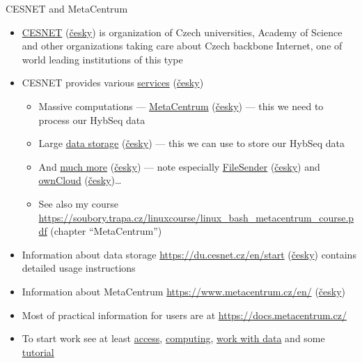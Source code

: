 \documentclass[compress,  xelatex, 11pt, xcolor=x11names, aspectratio=169,
	hyperref={
		bookmarks=true,
		unicode=true,
		colorlinks=true,
		pdftitle={HybSeq course},
		plainpages=false,
		pdfauthor={Vojtech Zeisek},
		pdfsubject={Practical processing of HybSeq target enrichment sequencing data on computing grids like MetaCentrum},
		pdfcreator={XeLaTeX},
		pdfkeywords={BASH, command line, GNU, HybSeq, Linux, MetaCentrum, sequencing shell, target enrichment},
		linkcolor=Turquoise4, %
		anchorcolor=DodgerBlue4, %
		citecolor=DodgerBlue4, %
		filecolor=DodgerBlue4, %
		menucolor=Tan4, %
		urlcolor=DarkOliveGreen4 %
		},
	url={hyphens, lowtilde} %
	]{beamer}
\renewcommand{\alert}[1]{\textcolor{OrangeRed3}{#1}}
\begin{document}
\begin{frame}[allowframebreaks]{CESNET and MetaCentrum}
	\label{CESNET}
	\begin{itemize}
		\item \href{https://www.cesnet.cz/en/}{CESNET} (\href{https://www.cesnet.cz/}{česky}) is organization of Czech universities, Academy of Science and other organizations taking care about Czech backbone Internet, one of world leading institutions of this type
		\item CESNET provides various \href{https://www.cesnet.cz/en/services}{services} (\href{https://www.cesnet.cz/sluzby/}{česky})
		\begin{itemize}
			\item Massive computations --- \href{https://www.cesnet.cz/en/services/computing-2/metacentrum-10}{MetaCentrum} (\href{https://www.cesnet.cz/sluzby/vypocty-2/narocne-vypocty-metacentrum-10}{česky}) --- \alert{this we need to process our HybSeq data}
			\item Large \href{https://www.cesnet.cz/en/services/data-storage-3/data-storage-13}{data storage} (\href{https://www.cesnet.cz/sluzby/datova-uloziste-3/datova-uloziste-13}{česky}) --- \alert{this we can use to store our HybSeq data}
			\item And \href{https://www.cesnet.cz/en/services}{much more} (\href{https://www.cesnet.cz/sluzby/}{česky}) --- note especially \href{https://www.cesnet.cz/en/services/data-storage-3/filesender-15}{FileSender} (\href{https://www.cesnet.cz/sluzby/datova-uloziste-3/filesender-15}{česky}) and \href{https://www.cesnet.cz/en/services/data-storage-3/owncloud-16}{ownCloud} (\href{https://www.cesnet.cz/sluzby/datova-uloziste-3/owncloud-16}{česky})\ldots
			\item See also my course \url{https://soubory.trapa.cz/linuxcourse/linux_bash_metacentrum_course.pdf} (chapter \enquote{MetaCentrum})
		\end{itemize}
		\item Information about data storage \url{https://du.cesnet.cz/en/start} (\href{https://du.cesnet.cz/cs/start}{česky}) contains detailed usage instructions
		\item Information about MetaCentrum \url{https://www.metacentrum.cz/en/} (\href{https://www.metacentrum.cz/cs/}{česky})
		\item Most of practical information for users are at \url{https://docs.metacentrum.cz/}
		\item To start work see at least \href{https://docs.metacentrum.cz/en/docs/access/log-in}{access}, \href{https://docs.metacentrum.cz/en/docs/computing/run-basic-job}{computing}, \href{https://docs.metacentrum.cz/en/docs/data/large-data}{work with data} and some \href{https://docs.metacentrum.cz/en/docs/tutorials}{tutorial}

\end{itemize}
\end{frame}
\end{document}
